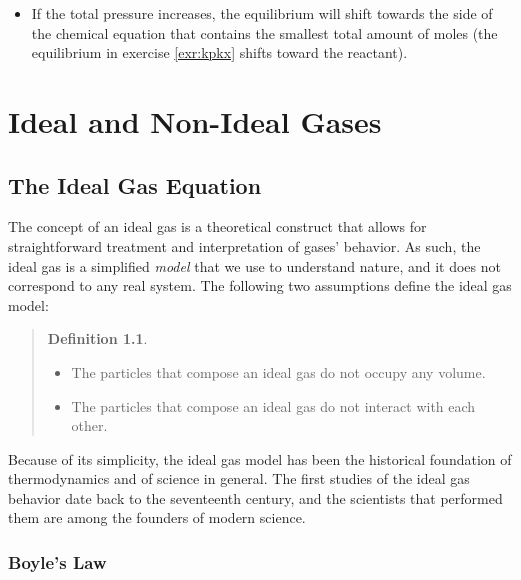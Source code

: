 \documentclass[
  9pt,
]{extbook}
\providecommand{\tightlist}{%
  \setlength{\itemsep}{0pt}\setlength{\parskip}{0pt}}
\theoremstyle{definition}
\newtheorem{definition}{Definition}[chapter]
\theoremstyle{definition}
\theoremstyle{definition}
\theoremstyle{remark}
\begin{document}
\begin{itemize}
\tightlist
\item
  If the total pressure increases, the equilibrium will shift towards the side of the chemical equation that contains the smallest total amount of moles (the equilibrium in exercise \ref{exr:kpkx} shifts toward the reactant).
\end{itemize}

\renewcommand*{\standardstate}{{-\kern-6pt{\ominus}\kern-6pt-}}

\hypertarget{RealGases}{%
\chapter{Ideal and Non-Ideal Gases}\label{RealGases}}

\hypertarget{the-ideal-gas-equation}{%
\section{The Ideal Gas Equation}\label{the-ideal-gas-equation}}

The concept of an ideal gas is a theoretical construct that allows for straightforward treatment and interpretation of gases' behavior. As such, the ideal gas is a simplified \emph{model} that we use to understand nature, and it does not correspond to any real system. The following two assumptions define the ideal gas model:

\begin{quote}
\begin{definition}
\protect\hypertarget{def:iedalgasdef}{}{\label{def:iedalgasdef} }

\begin{itemize}
\tightlist
\item
  The particles that compose an ideal gas do not occupy any volume.
\item
  The particles that compose an ideal gas do not interact with each other.
\end{itemize}
\end{definition}
\end{quote}

Because of its simplicity, the ideal gas model has been the historical foundation of thermodynamics and of science in general. The first studies of the ideal gas behavior date back to the seventeenth century, and the scientists that performed them are among the founders of modern science.

\hypertarget{boyles-law}{%
\subsection{Boyle's Law}\label{boyles-law}}
\end{document}
